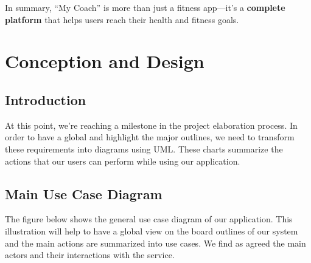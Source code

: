 \documentclass[12pt,a4paper]{report}
\begin{document}
In summary, ``My Coach'' is more than just a fitness app—it’s a \textbf{complete platform} that helps users reach their health and fitness goals.

\chapter{Conception and Design}
\section{Introduction}
At this point, we're reaching a milestone in the project elaboration process. In order to have a global and highlight the major outlines, we need to transform these requirements into diagrams using UML. These charts summarize the actions that our users can perform while using our application.
\section{Main Use Case Diagram}
The figure below shows the general use case diagram of our application. This illustration will help to have a global view on the board outlines of our system and the main actions are summarized into use cases. We find as agreed the main actors and their interactions with the service.
\vspace{0.8cm}
\end{document}
